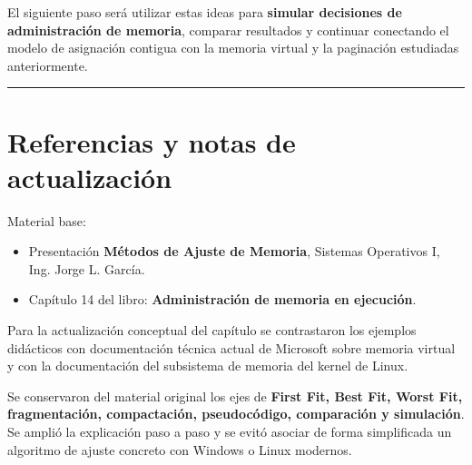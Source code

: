 \documentclass[
  spanish,
  letterpaper,
]{scrbook}
\providecommand{\tightlist}{%
  \setlength{\itemsep}{0pt}\setlength{\parskip}{0pt}}
\begin{document}
El siguiente paso será utilizar estas ideas para \textbf{simular
decisiones de administración de memoria}, comparar resultados y
continuar conectando el modelo de asignación contigua con la memoria
virtual y la paginación estudiadas anteriormente.

\begin{center}\rule{0.5\linewidth}{0.5pt}\end{center}


\chapter{Referencias y notas de
actualización}\label{referencias-y-notas-de-actualizaciuxf3n}

Material base:

\begin{itemize}
\tightlist
\item
  Presentación \textbf{Métodos de Ajuste de Memoria}, Sistemas
  Operativos I, Ing. Jorge L. García.
\item
  Capítulo 14 del libro: \textbf{Administración de memoria en
  ejecución}.
\end{itemize}

Para la actualización conceptual del capítulo se contrastaron los
ejemplos didácticos con documentación técnica actual de Microsoft sobre
memoria virtual y con la documentación del subsistema de memoria del
kernel de Linux.

\begin{tcolorbox}[enhanced jigsaw, arc=.35mm, bottomrule=.15mm, bottomtitle=1mm, breakable, colback=white, colbacktitle=quarto-callout-note-color!10!white, colframe=quarto-callout-note-color-frame, coltitle=black, left=2mm, leftrule=.75mm, opacityback=0, opacitybacktitle=0.6, rightrule=.15mm, title=\textcolor{quarto-callout-note-color}{\faInfo}\hspace{0.5em}{Criterio editorial}, titlerule=0mm, toprule=.15mm, toptitle=1mm]

Se conservaron del material original los ejes de \textbf{First Fit, Best
Fit, Worst Fit, fragmentación, compactación, pseudocódigo, comparación y
simulación}. Se amplió la explicación paso a paso y se evitó asociar de
forma simplificada un algoritmo de ajuste concreto con Windows o Linux
modernos.

\end{tcolorbox}

\end{document}

